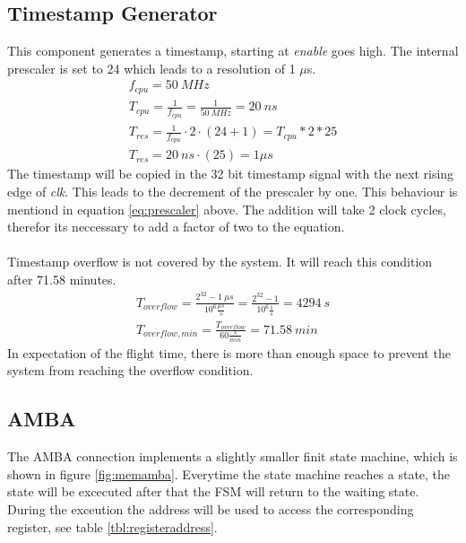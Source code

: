 \subsection{Timestamp Generator}
This component generates a timestamp, starting at \textit{enable} goes high. The internal prescaler is set to 24 which leads to a resolution of 1 $\mu$s.
\begin{equation}
	\begin{split}
		f_{cpu} = 50~MHz \\ 
		T_{cpu} = \frac{1}{f_{cpu}} = \frac{1}{50~MHz} = 20~ns \\
		T_{res} = \frac{1}{f_{cpu}} \cdot 2 \cdot \left(24 + 1\right) = T_{cpu} * 2 * 25\\
		T_{res} = 20~ns \cdot \left(25\right) = 1 \mu s
	\end{split}
\label{eq:prescaler}
\end{equation}
The timestamp will be copied in the 32 bit timestamp signal with the next rising edge of \textit{clk}. This leads to the decrement of the prescaler by one. This behaviour is mentiond in equation \ref{eq:prescaler} above.  The addition will take 2 clock cycles, therefor its neccessary to add a factor of two to the equation. \\ \\
Timestamp overflow is not covered by the system. It will reach this condition after 71.58 minutes.
\begin{equation}
	\begin{split}
		T_{overflow} = \frac{2^{32} - 1~\mu s}{10^{6} \frac{\mu s}{s}} = \frac{2^{32} - 1}{10^6 \frac{1}{s}} = 4294~s \\ 
		T_{overflow, min} = \frac{T_{overflow}}{60 \frac{s}{min}} = 71.58~min
	\end{split}
\end{equation}
In expectation of the flight time, there is more than enough space to prevent the system from reaching the overflow condition. 
\subsection{AMBA}
 
\noindent
The AMBA connection implements a slightly smaller finit state machine, which is shown in figure \ref{fig:memamba}. 
Everytime the state machine reaches a state, the state will be excecuted after that the FSM will return to the waiting state. During the exceution the address will be used to access the corresponding register, see table \ref{tbl:registeraddress}.
